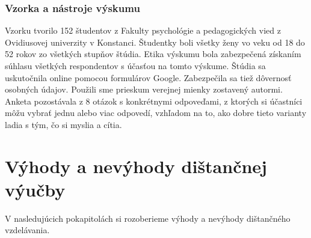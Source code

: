 \documentclass[10pt,oneside,slovak,a4paper]{article}
\begin{document}
\subsubsection{Vzorka a nástroje výskumu}
Vzorku tvorilo 152 študentov z Fakulty psychológie a pedagogických vied z Ovidiusovej univerzity v Konstanci.\cite{covid19}
Študentky boli všetky ženy vo veku od 18 do 52 rokov zo všetkých stupňov štúdia.
Etika výskumu bola zabezpečená získaním súhlasu všetkých respondentov s účasťou na tomto výskume.
Štúdia sa uskutočnila online pomocou formulárov Google. Zabezpečila sa tiež dôvernosť osobných údajov.
Použili sme prieskum verejnej mienky zostavený autormi. Anketa pozostávala z 8 otázok s konkrétnymi odpoveďami, z ktorých si účastníci môžu vybrať jednu alebo viac odpovedí,
vzhľadom na to, ako dobre tieto varianty ladia s tým, čo si myslia a cítia.


\section{Výhody a nevýhody dištančnej výučby}
V nasledujúcich pokapitolách si rozoberieme výhody a nevýhody dištančného vzdelávania\cite{Sokolova2018}. 
\end{document}
